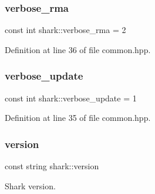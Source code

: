 \subsubsection{\texorpdfstring{verbose\+\_\+rma}{verbose\_rma}}
{\footnotesize\ttfamily const int shark\+::verbose\+\_\+rma = 2\hspace{0.3cm}{\ttfamily [static]}}



Definition at line 36 of file common.\+hpp.

\hypertarget{namespaceshark_a054837402a3923de5acc50070b378cd6}{}\label{namespaceshark_a054837402a3923de5acc50070b378cd6} 
\subsubsection{\texorpdfstring{verbose\+\_\+update}{verbose\_update}}
{\footnotesize\ttfamily const int shark\+::verbose\+\_\+update = 1\hspace{0.3cm}{\ttfamily [static]}}



Definition at line 35 of file common.\+hpp.

\hypertarget{namespaceshark_a448eaebf80d9b1ee807faf964db030de}{}\label{namespaceshark_a448eaebf80d9b1ee807faf964db030de} 
\subsubsection{\texorpdfstring{version}{version}}
{\footnotesize\ttfamily const string shark\+::version}

Shark version. 